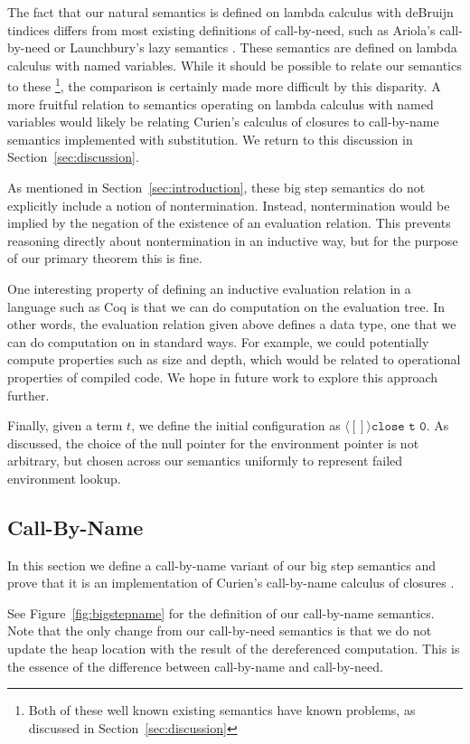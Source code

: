 The fact that our natural semantics is defined on lambda calculus with deBruijn
tindices differs from most existing definitions of call-by-need, such as
Ariola's call-by-need \cite{ariola1995call} or Launchbury's lazy semantics
\cite{launchburynatural}. These semantics are defined on lambda calculus with named
variables. While it should be possible to relate our semantics to these
\footnote{Both of these well known existing semantics have known problems, as
discussed in Section~\ref{sec:discussion}}, the comparison is certainly made
more difficult by this disparity. A more fruitful relation to semantics
operating on lambda calculus with named variables would likely be relating
Curien's calculus of closures to call-by-name semantics implemented with
substitution. We return to this discussion in Section~\ref{sec:discussion}.

As mentioned in Section~\ref{sec:introduction}, these big step semantics do not
explicitly include a notion of nontermination. Instead, nontermination would be
implied by the negation of the existence of an evaluation relation. This
prevents reasoning directly about nontermination in an inductive way, but for
the purpose of our primary theorem this is fine. 

One interesting property of defining an inductive evaluation relation in a
language such as Coq is that we can do computation on the evaluation tree. In other
words, the evaluation relation given above defines a data type, one that we can
do computation on in standard ways. For example, we could potentially compute
properties such as size and depth, which would be related to operational properties
of compiled code. We hope in future work to explore this approach further.

Finally, given a term $t$, we define the initial configuration as $\langle [] \rangle
\texttt{close t 0}$. As discussed, the choice of the null pointer for the environment
pointer is not arbitrary, but chosen across our semantics uniformly to represent
failed environment lookup. 

\subsection{Call-By-Name}

In this section we define a call-by-name variant of our big step semantics and
prove that it is an implementation of Curien's call-by-name calculus of
closures \cite{curien1991abstract}. 

See Figure~\ref{fig:bigstepname} for the definition of our call-by-name
semantics. Note that the only change from our call-by-need semantics is that we
do not update the heap location with the result of the dereferenced computation.
This is the essence of the difference between call-by-name and call-by-need.

